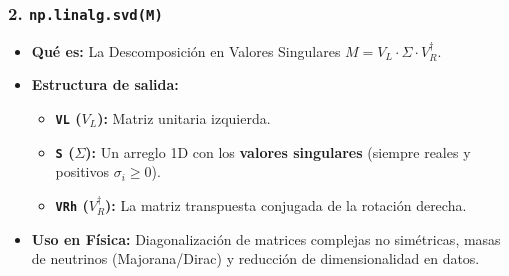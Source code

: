 \documentclass[12pt]{article}
\begin{document}
\begin{cajaflex}
\subsubsection*{\textcolor{teal!70!black}{2. \texttt{np.linalg.svd(M)}}}
\begin{itemize}
    \item \textbf{Qué es:} La Descomposición en Valores Singulares $M = V_L \cdot \Sigma \cdot V_R^\dagger$.
    \item \textbf{Estructura de salida:}
    \begin{itemize}
        \item \textbf{\texttt{VL} ($V_L$):} Matriz unitaria izquierda.
        \item \textbf{\texttt{S} ($\Sigma$):} Un arreglo 1D con los \textbf{valores singulares} (siempre reales y positivos $\sigma_i \ge 0$).
        \item \textbf{\texttt{VRh} ($V_R^\dagger$):} La matriz transpuesta conjugada de la rotación derecha.
    \end{itemize}
    \item \textbf{Uso en Física:} Diagonalización de matrices complejas no simétricas, masas de neutrinos (Majorana/Dirac) y reducción de dimensionalidad en datos.
\end{itemize}
\end{cajaflex}
\end{document}
